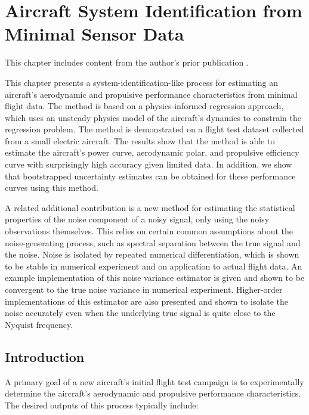 \chapter{Aircraft System Identification from Minimal Sensor Data}
\label{chap:aircraft_sysid}

\begin{attrib}
    This chapter includes content from the author's prior publication \cite{sharpe_physicsinformed_2024}.
\end{attrib}

This chapter presents a system-identification-like process for estimating an aircraft's aerodynamic and propulsive performance characteristics from minimal flight data. The method is based on a physics-informed regression approach, which uses an unsteady physics model of the aircraft's dynamics to constrain the regression problem. The method is demonstrated on a flight test dataset collected from a small electric aircraft. The results show that the method is able to estimate the aircraft's power curve, aerodynamic polar, and propulsive efficiency curve with surprisingly high accuracy given limited data. In addition, we show that bootstrapped uncertainty estimates can be obtained for these performance curves using this method.

A related additional contribution is a new method for estimating the statistical properties of the noise component of a noisy signal, only using the noisy observations themselves. This relies on certain common assumptions about the noise-generating process, such as spectral separation between the true signal and the noise. Noise is isolated by repeated numerical differentiation, which is shown to be stable in numerical experiment and on application to actual flight data. An example implementation of this noise variance estimator is given and shown to be convergent to the true noise variance in numerical experiment. Higher-order implementations of this estimator are also presented and shown to isolate the noise accurately even when the underlying true signal is quite close to the Nyquist frequency.


\section{Introduction}

A primary goal of a new aircraft's initial flight test campaign is to experimentally determine the aircraft's aerodynamic and propulsive performance characteristics. The desired outputs of this process typically include:

